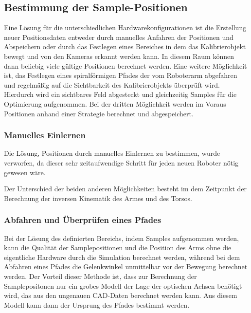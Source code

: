 \subsection{Bestimmung der Sample-Positionen}
\label{sub:Bestimmung der Sample-Positionen}

Eine Lösung für die unterschiedlichen Hardwarekonfigurationen ist die Erstellung
neuer Positionsdaten entweder durch manuelles Anfahren der Positionen und 
Abspeichern oder durch das Festlegen eines Bereiches in dem das Kalibrierobjekt
bewegt und von den Kameras erkannt werden kann. In diesem Raum können dann
beliebig viele gültige Positionen berechnet werden. Eine weitere Möglichkeit
ist, das Festlegen eines spiralförmigen Pfades der vom Roboterarm abgefahren 
und regelmäßig auf die Sichtbarkeit des Kalibrierobjekts überprüft wird. Hierdurch
wird ein sichtbares Feld abgesteckt und gleichzeitig Samples für die 
Optimierung aufgenommen. Bei der dritten Möglichkeit werden im Voraus Positionen
anhand einer Strategie berechnet und abgespeichert.

\subsubsection{Manuelles Einlernen}
\label{ssub:Manuelles Einlernen}
Die Lösung, Positionen durch manuelles Einlernen zu bestimmen, wurde verworfen,
da dieser sehr zeitaufwendige Schritt für jeden neuen Roboter nötig gewesen wäre.

Der Unterschied der beiden anderen Möglichkeiten besteht im dem Zeitpunkt der 
Berechnung der inversen Kinematik des Armes und des Torsos.

\subsubsection{Abfahren und Überprüfen eines Pfades}
\label{ssub:Abfahren und Überprüfen eines Pfades}

Bei der Lösung des 
definierten Bereichs, indem Samples aufgenommen werden, kann die Qualität der 
Samplepositionen und die Position des Arms ohne die eigentliche Hardware durch
die Simulation berechnet werden, 
während bei dem Abfahren eines Pfades die Gelenkwinkel unmittelbar vor der 
Bewegung berechnet werden. Der Vorteil dieser Methode ist, dass zur Berechnung
der Samplepositonen nur ein grobes Modell der Lage der optischen Achsen benötigt
wird, das aus den ungenauen CAD-Daten berechnet werden kann. Aus diesem Modell
kann dann der Ursprung des Pfades bestimmt werden. 


